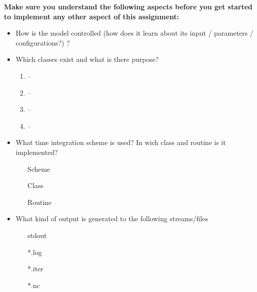 \documentclass[jobname=project, 10pt]{article}
\begin{document}
\noindent\textbf{Make sure you understand the following aspects before you get started to implement any other aspect of this assignment:}
\begin{itemize}
\item How is the model controlled (how does it learn about its input / parameters / configurations?) ?
\item Which classes exist and what is there purpose?
  \begin{enumerate}
    \setlength{\itemsep}{1.5em}
  \item \underline{\phantom{CFQGCFQGCFQGCFQG}} -- \underline{\phantom{CFQGCFQGCFQGCFQG}}
  \item \underline{\phantom{CFQGCFQGCFQGCFQG}} -- \underline{\phantom{CFQGCFQGCFQGCFQG}}
  \item \underline{\phantom{CFQGCFQGCFQGCFQG}} -- \underline{\phantom{CFQGCFQGCFQGCFQG}}
  \item \underline{\phantom{CFQGCFQGCFQGCFQG}} -- \underline{\phantom{CFQGCFQGCFQGCFQG}}
  \end{enumerate}
\item What time integration scheme is used? In wich class and routine is it implemented? 
  \begin{itemize} 
    \setlength{\itemsep}{1.5em}
  \item[Scheme] \underline{\hspace{6cm}}
  \item[Class]  \underline{\hspace{6cm}}
  \item[Routine] \underline{\hspace{6cm}}
  \end{itemize}
    
\item What kind of output is generated to the following streams/files 
  \begin{itemize}
    \setlength{\itemsep}{1.5em}

  \item[stdout] \underline{\hspace{6cm}}
  \item[*.log] \underline{\hspace{6cm}} 
  \item[*.iter] \underline{\hspace{6cm}}
  \item[*.nc] \underline{\hspace{6cm}} 
  \end{itemize}

\end{itemize} 
\end{document}
